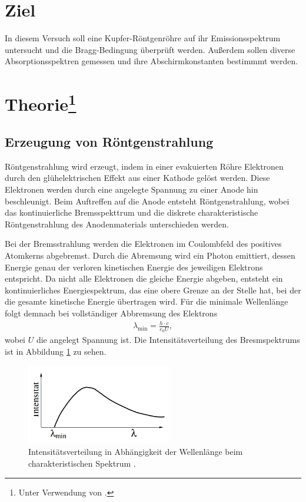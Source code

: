 \section{Ziel}
In diesem Versuch soll eine Kupfer-Röntgenröhre auf ihr Emissionsspektrum untersucht und die Bragg-Bedingung überprüft werden.
Außerdem sollen diverse Absorptionsspektren gemessen und ihre Abschirmkonstanten bestimmmt werden.


\section[Theorie]{Theorie\footnote[1]{Unter Verwendung von \cite[]{man:v602}.}}

\subsection{Erzeugung von Röntgenstrahlung}
Röntgenstrahlung wird erzeugt, indem in einer evakuierten Röhre Elektronen durch den glühelektrischen Effekt aus einer Kathode gelöst werden.
Diese Elektronen werden durch eine angelegte Spannung zu einer Anode hin beschleunigt.
Beim Auftreffen auf die Anode entsteht Röntgenstrahlung, wobei das kontinuierliche Bremsspekttrum und die diskrete charakteristische Röntgenstrahlung des Anodenmaterials unterschieden werden.

\noindent
Bei der Bremsstrahlung werden die Elektronen im Coulombfeld des positives Atomkerns abgebremst.
Durch die Abremsung wird ein Photon emittiert, dessen Energie genau der verloren kinetischen Energie des jeweiligen Elektrons entspricht.
Da nicht alle Elektronen die gleiche Energie abgeben, entsteht ein kontinuierliches Energiespektrum, das eine obere Grenze an der Stelle hat,
bei der die gesamte kinetische Energie übertragen wird.
Für die minimale Wellenlänge folgt demnach bei vollständiger Abbremsung des Elektrons
\begin{align}
    \lambda_\text{min} = \frac{h \cdot c}{e_0 U},
    \label{eq:wellenlaenge}
\end{align}
wobei $U$ die angelegt Spannung ist.
Die Intensitätsverteilung des Bresmspektrums ist in Abbildung \ref{fig:bremsspektrum} zu sehen.
\begin{figure}[H]
    \centering
    \includegraphics[height = 3.5cm]{Abbildungen/bremsspektrum.png}
    \caption{Intensitätsverteilung in Abhängigkeit der Wellenlänge beim charakteristischen Spektrum \cite[]{man:v602}.}
    \label{fig:bremsspektrum}
\end{figure}

